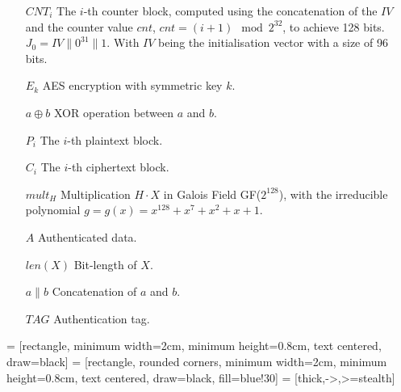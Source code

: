 \begin{itemize}
  \item[$CNT_i$] The $i$-th counter block, computed using the concatenation of
the $IV$ and the counter value $cnt$, $cnt = (i+1) \mod{2^{32}}$, to achieve 128
bits. $J_0 = IV \parallel 0 ^{31} \parallel 1$. With $IV$ being the
initialisation vector with a size of 96 bits.
  \item[$E_k$] AES encryption with symmetric key $k$.
  \item[$a \oplus b$] XOR operation between $a$ and $b$.
  \item[$P_i$] The $i$-th plaintext block.
  \item[$C_i$] The $i$-th ciphertext block.
  \item[$mult_H$] Multiplication $H \cdot X$ in Galois Field GF($2^{128}$), 
with the irreducible polynomial $g = g(x) = x^{128} + x^{7} + x^{2} + x + 1$.
  \item[$A$] Authenticated data.
  \item[$len(X)$] Bit-length of $X$.
  \item[$a \parallel b$] Concatenation of $a$ and $b$.
  \item[$TAG$] Authentication tag.
\end{itemize}

 = [rectangle, minimum width=2cm, minimum height=0.8cm, 
text centered, draw=black]
 = [rectangle, rounded corners, minimum width=2cm, 
minimum height=0.8cm, text centered, draw=black, fill=blue!30]
 = [thick,->,>=stealth]


